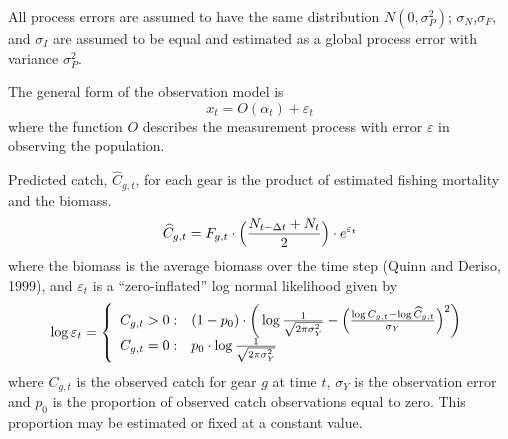 \documentclass[12pt,letterpaper]{article}
\begin{document}
All process errors are assumed to have the same distribution
$N(0,\sigma^2_P)$; $\sigma_N$,$\sigma_F$, and $\sigma_I$ are assumed
to be equal and estimated as a global process error with variance
$\sigma^2_P$.

The general form of the observation model is
\begin{equation}
x_t = O(\alpha_t) + \varepsilon_t
\end{equation}
where the function $O$ describes the measurement process with
error $\varepsilon$ in observing the population.

Predicted catch, $\widehat{C}_{g,t}$, for each gear is the product of
estimated fishing mortality and the biomass.
\begin{equation}
\widehat{C}_{g,t} = F_{g,t}\cdot\Bigl(\frac{N_{t-\Delta
t}+N_t}{2}\Bigr) \cdot e^{\varepsilon_t}
\label{eqn:obs1}
\end{equation}
where the biomass is  the average
biomass over the time step (Quinn and Deriso, 1999), and
$\varepsilon_t$ is a ``zero-inflated'' log normal likelihood given by
\begin{equation}
  \log \varepsilon_t = \left\{
    \begin{array}{r@{\;:\quad}l}
       C_{g,t} > 0 &
(1-p_0)\cdot\bigg(\log\frac{1}{\sqrt{2\pi\sigma^2_Y}}
          -\Bigl(\frac{\log
C_{g,t}-\log\widehat{C}_{g,t}}{\sigma_Y}\Bigr)^2\bigg)\\
       C_{g,t} = 0 & p_0 \cdot\log \frac{1}{\sqrt{2\pi\sigma^2_Y}}\\
    \end{array}
  \right.
\end{equation}
where $C_{g,t}$ is the observed catch for gear $g$ at time $t$,
$\sigma_Y$ is the observation error and
$p_0$ is the proportion of observed catch observations equal to zero.
This proportion may be estimated or fixed at a constant value. 
\end{document}
